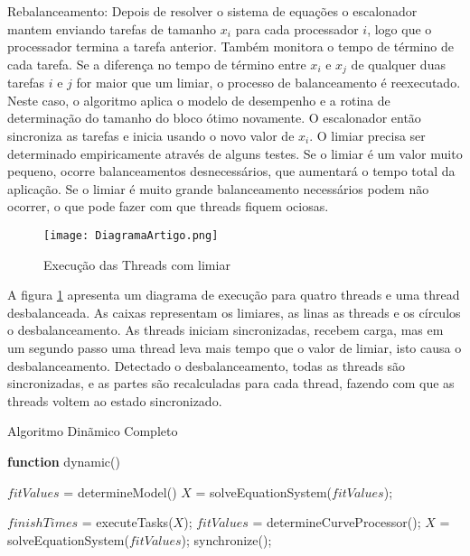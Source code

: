 Rebalanceamento: Depois de resolver o sistema de equações o escalonador mantem enviando tarefas de tamanho $x_i$ para cada processador $i$, logo que o processador termina a tarefa anterior. Também monitora o tempo de término de cada tarefa. Se a diferença no tempo de término entre $x_i$ e $x_j$ de qualquer duas tarefas $i$ e $j$ for maior que um limiar, o processo de balanceamento é reexecutado. Neste caso, o algoritmo aplica o modelo de desempenho e a rotina de determinação do tamanho do bloco ótimo novamente. O escalonador então sincroniza as tarefas e inicia usando o novo valor de $x_i$. O limiar precisa ser determinado empiricamente através de alguns testes. Se o limiar é um valor muito pequeno, ocorre balanceamentos desnecessários, que aumentará o tempo total da aplicação. Se o limiar é muito grande balanceamento necessários podem não ocorrer, o que pode fazer com que threads fiquem ociosas.

\begin{figure}[!t]
	\centering
			\texttt{[image: DiagramaArtigo.png]}
	\caption{Execução das Threads com limiar}
	\label{fig:Diagrama}
\end{figure}

A figura \ref{fig:Diagrama} apresenta um diagrama de execução para quatro threads e uma thread desbalanceada. As caixas representam os limiares, as linas as threads e os círculos o desbalanceamento. As threads iniciam sincronizadas, recebem carga, mas em um segundo passo uma thread leva mais tempo que o valor de limiar, isto causa o desbalanceamento. Detectado o desbalanceamento, todas as threads são sincronizadas, e as partes são recalculadas para cada thread, fazendo com que as threads voltem ao estado sincronizado.



\begin{algorithm}

\caption{Algoritmo Dinãmico Completo}
\label{alg1}

\begin{algorithmic}		

\STATE \textbf{function} dynamic()

\STATE $fitValues$ = determineModel()
\STATE $X$ = solveEquationSystem($fitValues$);


	\STATE $finishTimes$ = executeTasks($X$);
		\STATE $fitValues$ = determineCurveProcessor();
                \STATE $X$ = solveEquationSystem($fitValues$);
                \STATE synchronize();
    	\ENDIF
\ENDWHILE

\end{algorithmic}
\end{algorithm}

